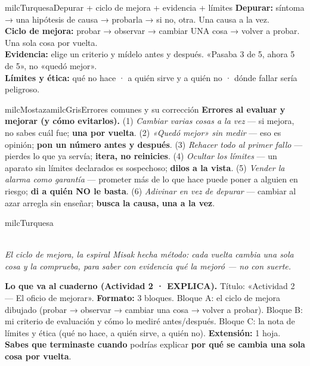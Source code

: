 \documentclass[11pt,letterpaper]{article}
\newcommand{\guiaDiagrama}[2]{%
\begin{center}
\\[1.5mm]
{\footnotesize\itshape\textcolor{milcNegro!75}{#2}}
\end{center}
}
\begin{document}
\begin{drawbox}{milcTurquesa}{Depurar + ciclo de mejora + evidencia + límites}
\textbf{Depurar:} síntoma → una hipótesis de causa → probarla → si no, otra. Una causa a la vez. \\[1mm]
\textbf{Ciclo de mejora:} probar → observar → cambiar UNA cosa → volver a probar. Una sola cosa por vuelta. \\[1mm]
\textbf{Evidencia:} elige un criterio y mídelo antes y después. «Pasaba 3 de 5, ahora 5 de 5», no «quedó mejor». \\[1mm]
\textbf{Límites y ética:} qué no hace · a quién sirve y a quién no · dónde fallar sería peligroso.
\end{drawbox}

\begin{softbox}{milcMostaza}{milcGris}{Errores comunes y su corrección}
\textbf{Errores al evaluar y mejorar (y cómo evitarlos).} (1) \emph{Cambiar varias cosas a la vez} --- si mejora, no sabes cuál fue; \textbf{una por vuelta}. (2) \emph{«Quedó mejor» sin medir} --- eso es opinión; \textbf{pon un número antes y después}. (3) \emph{Rehacer todo al primer fallo} --- pierdes lo que ya servía; \textbf{itera, no reinicies}. (4) \emph{Ocultar los límites} --- un aparato sin límites declarados es sospechoso; \textbf{dilos a la vista}. (5) \emph{Vender la alarma como garantía} --- prometer más de lo que hace puede poner a alguien en riesgo; \textbf{di a quién NO le basta}. (6) \emph{Adivinar en vez de depurar} --- cambiar al azar arregla sin enseñar; \textbf{busca la causa, una a la vez}.
\end{softbox}

\begin{infoband}{milcTurquesa}
\guiaDiagrama{assets/robotica-4/ciclo-de-mejora.tex}{El ciclo de mejora, la espiral Misak hecha método: cada vuelta cambia una sola cosa y la comprueba, para saber con evidencia qué la mejoró — no con suerte.}

\textbf{Lo que va al cuaderno (Actividad 2 · EXPLICA).} Título: «Actividad 2 --- El oficio de mejorar». \textbf{Formato:} 3 bloques. Bloque A: el ciclo de mejora dibujado (probar → observar → cambiar una cosa → volver a probar). Bloque B: mi criterio de evaluación y cómo lo mediré antes/después. Bloque C: la nota de límites y ética (qué no hace, a quién sirve, a quién no). \textbf{Extensión:} 1 hoja. \textbf{Sabes que terminaste cuando} podrías explicar \textbf{por qué se cambia una sola cosa por vuelta}.
\end{infoband}
\end{document}
